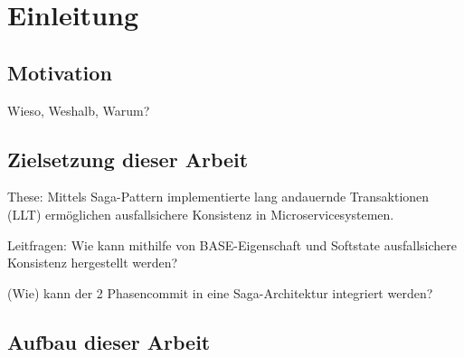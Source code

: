 \chapter{Einleitung}

\section{Motivation}

Wieso, Weshalb, Warum?

\section{Zielsetzung dieser Arbeit}

These: Mittels Saga-Pattern implementierte lang andauernde Transaktionen (LLT) ermöglichen ausfallsichere Konsistenz in Microservicesystemen. 

Leitfragen: 
Wie kann mithilfe von BASE-Eigenschaft und Softstate ausfallsichere Konsistenz hergestellt werden?

(Wie) kann der 2 Phasencommit in eine Saga-Architektur integriert werden?

\section{Aufbau dieser Arbeit}

